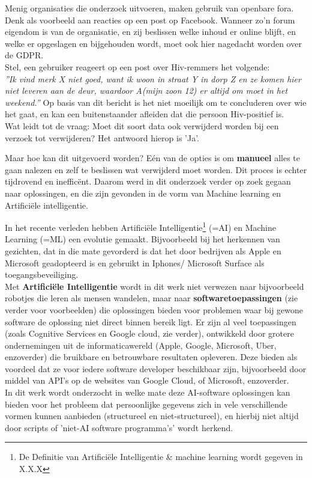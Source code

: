 Menig organisaties die onderzoek uitvoeren, maken gebruik van openbare fora. Denk als voorbeeld aan reacties op een post op Facebook. Wanneer zo'n forum eigendom is van de organisatie, en zij beslissen welke inhoud er online blijft, en welke er opgeslagen en bijgehouden wordt, moet ook hier nagedacht worden over de GDPR. \\ Stel, een gebruiker reageert op een post over Hiv-remmers het volgende:\\
 \textit{”Ik vind merk X niet goed, want ik woon in straat Y in dorp Z en ze komen hier niet leveren aan de deur, waardoor A(mijn zoon 12) er altijd om moet in het weekend.”}
Op basis van dit bericht is het niet moeilijk om te concluderen over wie het gaat, en kan een buitenstaander afleiden dat die persoon Hiv-positief is. \\ Wat leidt tot de vraag: Moet dit soort data ook verwijderd worden bij een verzoek tot verwijderen? Het antwoord hierop is 'Ja'.

 Maar hoe kan dit uitgevoerd worden? Eén van de opties is om \textbf{manueel} alles te gaan nalezen en zelf te beslissen wat verwijderd moet worden. Dit proces is echter tijdrovend en inefficënt. Daarom werd in dit onderzoek verder op zoek gegaan naar oplossingen, en die zijn gevonden in de vorm van Machine learning en Artificiële intelligentie.


In het recente verleden hebben Artificiële Intelligentie\footnote{De Definitie van Artificiële Intelligentie \& machine learning wordt gegeven in X.X.X } (=AI) en Machine Learning (=ML) een evolutie gemaakt. Bijvoorbeeld bij het herkennen van gezichten, dat in die mate gevorderd is dat het door bedrijven als Apple en Microsoft geadopteerd is en gebruikt in Iphones/ Microsoft Surface als toegangsbeveiliging.\\
Met \textbf{Artificiële Intelligentie} wordt in dit werk niet verwezen naar bijvoorbeeld robotjes die leren als mensen wandelen, maar naar \textbf{softwaretoepassingen} (zie verder voor voorbeelden) die oplossingen bieden voor problemen waar bij gewone software de oplossing niet direct binnen bereik ligt. 
Er zijn al veel toepassingen (zoals Cognitive Services en Google cloud, zie verder), ontwikkeld door grotere ondernemingen uit de informaticawereld (Apple, Google, Microsoft, Uber, enzoverder) die bruikbare en betrouwbare resultaten opleveren. Deze bieden als voordeel dat ze voor iedere software developer beschikbaar zijn, bijvoorbeeld door middel van API's op de websites van Google Cloud, of Microsoft, enzoverder.\\
 In dit werk wordt onderzocht in welke mate deze AI-software oplossingen kan bieden voor het probleem dat persoonlijke gegevens zich in vele verschillende vormen kunnen aanbieden (structureel en niet-structureel), en hierbij niet altijd door scripts of 'niet-AI software programma's' wordt herkend.  

